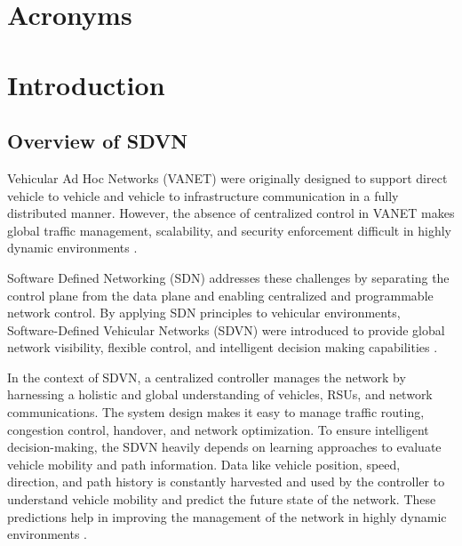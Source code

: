 \documentclass[12pt, a4paper]{report}
\begin{document}
\newpage


\tableofcontents
\newpage

\listoffigures
\newpage

\listoftables
\newpage

\chapter*{Acronyms}
\printacronyms[heading=none] %

\newpage

\renewcommand{\thepage}{\arabic{page}} %
\setcounter{page}{1} %

\chapter{Introduction}
\section{Overview of SDVN}

Vehicular Ad Hoc Networks (\ac{VANET}) were originally designed to support direct vehicle to vehicle and vehicle to infrastructure communication in a fully distributed manner. However, the absence of centralized control in VANET makes global traffic management, scalability, and security enforcement difficult in highly dynamic environments \cite{hartenstein2008}.

Software Defined Networking (SDN) addresses these challenges by separating the control plane from the data plane and enabling centralized and programmable network control. By applying SDN principles to vehicular environments, Software-Defined Vehicular Networks (SDVN) were introduced to provide global network visibility, flexible control, and intelligent decision making capabilities \cite{wahid2022}.

In the context of SDVN, a centralized controller manages the network by harnessing a holistic and global understanding of vehicles, RSUs, and network communications. The system design makes it easy to manage traffic routing, congestion control, handover, and network optimization. To ensure intelligent decision-making, the SDVN heavily depends on learning approaches to evaluate vehicle mobility and path information. Data like vehicle position, speed, direction, and path history is constantly harvested and used by the controller to understand vehicle mobility and predict the future state of the network. These predictions help in improving the management of the network in highly dynamic environments \cite{cabarkapa2019}.
\end{document}
